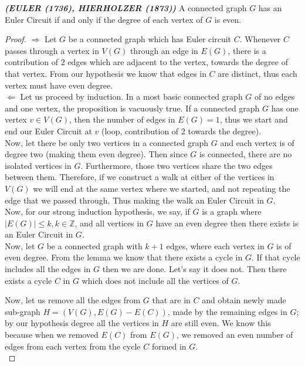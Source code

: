 \documentclass[12pt, fullpage]{article}
\newcommand{\Z}{\mathbb Z}
\begin{document}
	\textit{\textbf{(EULER (1736), HIERHOLZER (1873))}} A connected graph $G$ has an Euler Circuit if and only if the degree of each vertex of $G$ is even.
\begin{proof}
 	$\Longrightarrow$ Let $G$ be a connected graph which has Euler circuit $C$. Whenever $C$ passes through a vertex in $V(G)$ through an edge in $E(G)$, there is a contribution of 2 edges which are adjacent to the vertex, towards the degree of that vertex. From our hypothesis we know that edges in $C$ are distinct, thus each vertex must have even degree. \\
 	
 	$\Longleftarrow$ Let us proceed by induction. In a most basic connected graph $G$ of no edges and one vertex, the proposition is vacuously true. If a connected graph $G$ has one vertex $v \in V(G)$, then the number of edges in $E(G) = 1$, thus we start and end our Euler Circuit at $v$ (loop, contribution of 2 towards the degree). \\
 	
 	Now, let there be only two vertices in a connected graph $G$ and each vertex is of degree two (making them even degree). Then since $G$ is connected, there are no isolated vertices in $G$. Furthermore, those two vertices share the two edges between them. Therefore, if we construct a walk at either of the vertices in $V(G)$ we will end at the same vertex where we started, and not repeating the edge that we passed through. Thus making the walk an Euler Circuit in $G$.\\ 
 	
 	Now, for our strong induction hypothesis, we say, if $G$ is a graph where $\vert E(G)\vert \leq k, k \in \Z$, and all vertices in $G$ have an even degree then there exists	 is an Euler Circuit in $G$.\\
 	
 	 Now, let $G$ be a connected graph with $k+1$ edges, where each vertex in $G$ is of even degree. From the lemma we know that there exists a cycle in $G$. If that cycle includes all the edges in $G$ then we are done. Let's say it does not. Then there exists a cycle $C$ in $G$ which does not include all the vertices of $G$. 
 	 
 	 Now, let us remove all the edges from $G$ that are in $C$ and obtain newly made sub-graph $H = (V(G), E(G)-E(C))$, made by the remaining edges in $G$; by our hypothesis degree all the vertices in $H$ are still even. We know this because when we removed $E(C)$ from $E(G)$, we removed an even number of edges from each vertex from the cycle $C$ formed in $G$.\\
 	 

\end{proof}
\end{document}
